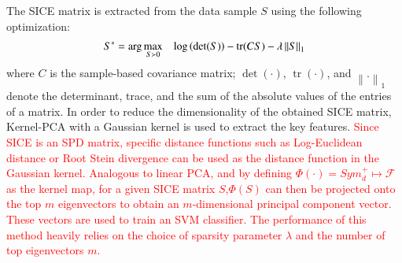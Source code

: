 \documentclass[preprint,12pt]{elsarticle}
\newcommand\norm[1]{\left\lVert#1\right\rVert}
\begin{document}
The SICE matrix is extracted from the data sample $S$ using the following optimization: 
\begin{align}
S^* = \operatorname{arg} \max\limits_{S\succ 0} \hspace{3mm} \log \left( \det(S) \right) - \operatorname{tr}(CS) - \lambda \norm{S}_1
\end{align}
where $C$ is the sample-based covariance matrix; $\det(·)$, $\operatorname{tr}(·)$,
and $\norm{.}_1$ denote the determinant, trace, and the sum of the absolute values of the entries of a matrix. 
In order to reduce the dimensionality of the obtained SICE matrix, Kernel-PCA with a Gaussian kernel is used  to extract the key features.
\textcolor{red}{Since SICE is an SPD matrix, specific distance functions such as Log-Euclidean distance\cite{r49} or Root Stein divergence\cite{r50} can be used as the distance function in the Gaussian kernel. Analogous to linear PCA, and by defining 
	$\Phi(\cdot) = Sym^{+}_{d} \mapsto \mathcal{F}$ as the kernel map, 
	for a given SICE matrix $S$,$\Phi(S)$ can then be projected onto the top $m$ eigenvectors to obtain an $m$-dimensional principal
	component vector. These vectors are used to train an SVM classifier. The performance of this method heavily relies on the choice of sparsity parameter $\lambda$ and the number of top eigenvectors $m$. }   
\end{document}
